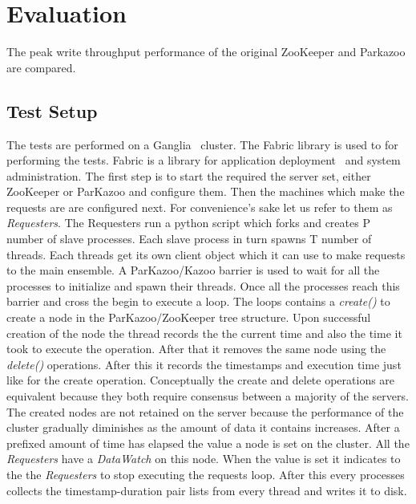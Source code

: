\chapter{Evaluation}

The peak write throughput performance of the original ZooKeeper and Parkazoo are compared.

\section{Test Setup}
The tests are performed on a Ganglia~\cite{sacerdoti2003wide} cluster. The Fabric library is used to for performing the tests. Fabric is a library for application deployment~\cite{spotswood2003systems} and system administration. The first step is to start the required the server set, either ZooKeeper or ParKazoo and configure them. Then the machines which make the requests are are configured next. For convenience's sake let us refer to them as \textit{Requesters}. The Requesters run a python script which forks and creates P number of slave processes. Each slave process in turn spawns T number of threads. Each threads get its own client object which it can use to make requests to the main ensemble. A ParKazoo/Kazoo barrier is used to wait for all the processes to initialize and spawn their threads. Once all the processes reach this barrier and cross the begin to execute a loop. The loops contains a \textit{create()} to create a node in the ParKazoo/ZooKeeper tree structure. Upon successful creation of the node the thread records the the current time and also the time it took to execute the operation. After that it removes the same node using the \textit{delete()} operations. After this it records the timestamps and execution time just like for the create operation. Conceptually the create and delete operations are equivalent because they both require consensus between a majority of the servers. The created nodes are not retained on the server because the performance of the cluster gradually diminishes as the amount of data it contains increases. After a prefixed amount of time has elapsed the value a node is set on the cluster. All the \textit{Requesters} have a \textit{DataWatch} on this node. When the value is set it indicates to the the \textit{Requesters} to stop executing the requests loop. After this every processes collects the timestamp-duration pair lists from every thread and writes it to disk. 

